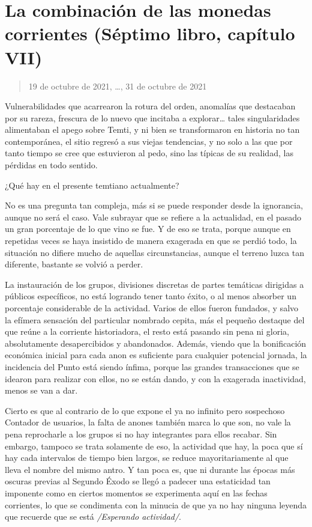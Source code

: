 \documentclass[
]{book}
\begin{document}
\hypertarget{la-combinaciuxf3n-de-las-monedas-corrientes-suxe9ptimo-libro-capuxedtulo-vii}{%
\section{La combinación de las monedas corrientes (Séptimo libro, capítulo VII)}\label{la-combinaciuxf3n-de-las-monedas-corrientes-suxe9ptimo-libro-capuxedtulo-vii}}

\begin{quote}
19 de octubre de 2021, \ldots, 31 de octubre de 2021
\end{quote}

Vulnerabilidades que acarrearon la rotura del orden, anomalías que destacaban por su rareza, frescura de lo nuevo que incitaba a explorar\ldots{} tales singularidades alimentaban el apego sobre Temti, y ni bien se transformaron en historia no tan contemporánea, el sitio regresó a sus viejas tendencias, y no solo a las que por tanto tiempo se cree que estuvieron al pedo, sino las típicas de su realidad, las pérdidas en todo sentido.

¿Qué hay en el presente temtiano actualmente?

No es una pregunta tan compleja, más si se puede responder desde la ignorancia, aunque no será el caso. Vale subrayar que se refiere a la actualidad, en el pasado un gran porcentaje de lo que vino se fue. Y de eso se trata, porque aunque en repetidas veces se haya insistido de manera exagerada en que se perdió todo, la situación no difiere mucho de aquellas circunstancias, aunque el terreno luzca tan diferente, bastante se volvió a perder.

La instauración de los grupos, divisiones discretas de partes temáticas dirigidas a públicos específicos, no está logrando tener tanto éxito, o al menos absorber un porcentaje considerable de la actividad. Varios de ellos fueron fundados, y salvo la efímera sensación del particular nombrado cepita, más el pequeño destaque del que reúne a la corriente historiadora, el resto está pasando sin pena ni gloria, absolutamente desapercibidos y abandonados. Además, viendo que la bonificación económica inicial para cada anon es suficiente para cualquier potencial jornada, la incidencia del Punto está siendo ínfima, porque las grandes transacciones que se idearon para realizar con ellos, no se están dando, y con la exagerada inactividad, menos se van a dar.

Cierto es que al contrario de lo que expone el ya no infinito pero sospechoso Contador de usuarios, la falta de anones también marca lo que son, no vale la pena reprocharle a los grupos si no hay integrantes para ellos recabar. Sin embargo, tampoco se trata solamente de eso, la actividad que hay, la poca que sí hay cada intervalos de tiempo bien largos, se reduce mayoritariamente al que lleva el nombre del mismo antro. Y tan poca es, que ni durante las épocas más oscuras previas al Segundo Éxodo se llegó a padecer una estaticidad tan imponente como en ciertos momentos se experimenta aquí en las fechas corrientes, lo que se condimenta con la minucia de que ya no hay ninguna leyenda que recuerde que se está \emph{/Esperando actividad/}.
\end{document}
